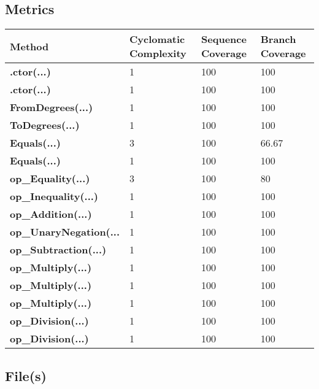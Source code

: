 \documentclass[a4paper,10pt]{article}
\begin{document}
\subsection{Metrics}
\begin{longtable}[l]{|l|l|l|l|}
\hline
\textbf{Method} & \textbf{Cyclomatic Complexity} & \textbf{Sequence Coverage} & \textbf{Branch Coverage}\\
\hline
\textbf{.ctor(...)} & 1 & 100 & 100\\
\hline
\textbf{.ctor(...)} & 1 & 100 & 100\\
\hline
\textbf{FromDegrees(...)} & 1 & 100 & 100\\
\hline
\textbf{ToDegrees(...)} & 1 & 100 & 100\\
\hline
\textbf{Equals(...)} & 3 & 100 & 66.67\\
\hline
\textbf{Equals(...)} & 1 & 100 & 100\\
\hline
\textbf{op\_Equality(...)} & 3 & 100 & 80\\
\hline
\textbf{op\_Inequality(...)} & 1 & 100 & 100\\
\hline
\textbf{op\_Addition(...)} & 1 & 100 & 100\\
\hline
\textbf{op\_UnaryNegation(...} & 1 & 100 & 100\\
\hline
\textbf{op\_Subtraction(...)} & 1 & 100 & 100\\
\hline
\textbf{op\_Multiply(...)} & 1 & 100 & 100\\
\hline
\textbf{op\_Multiply(...)} & 1 & 100 & 100\\
\hline
\textbf{op\_Multiply(...)} & 1 & 100 & 100\\
\hline
\textbf{op\_Division(...)} & 1 & 100 & 100\\
\hline
\textbf{op\_Division(...)} & 1 & 100 & 100\\
\hline
\end{longtable}
\subsection{File(s)}
\end{document}
